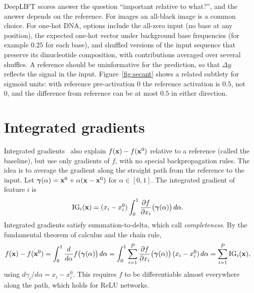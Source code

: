 DeepLIFT scores answer the question ``important relative to what?'', and the answer depends on the reference. For images an all-black image is a common choice. For one-hot DNA, options include the all-zero input (no base at any position), the expected one-hot vector under background base frequencies (for example $0.25$ for each base), and shuffled versions of the input sequence that preserve its dinucleotide composition, with contributions averaged over several shuffles. A reference should be uninformative for the prediction, so that $\Delta y$ reflects the signal in the input. Figure~\ref{fig:secant} shows a related subtlety for sigmoid units: with reference pre-activation 0 the reference activation is $0.5$, not 0, and the difference from reference can be at most $0.5$ in either direction.

\section{Integrated gradients}
\label{sec:ig}

Integrated gradients~\citep{sundararajan2017} also explain $f(\mathbf{x})-f(\mathbf{x}^0)$ relative to a reference (called the baseline), but use only gradients of $f$, with no special backpropagation rules. The idea is to average the gradient along the straight path from the reference to the input. Let $\boldsymbol{\gamma}(\alpha)=\mathbf{x}^0+\alpha(\mathbf{x}-\mathbf{x}^0)$ for $\alpha\in[0,1]$. The integrated gradient of feature $i$ is
\begin{equation}
  \operatorname{IG}_i(\mathbf{x}) = (x_i-x_i^0)\int_0^1 \frac{\partial f}{\partial x_i}\big(\boldsymbol{\gamma}(\alpha)\big)\,d\alpha .
  \label{eq:ig}
\end{equation}
Integrated gradients satisfy summation-to-delta, which \citet{sundararajan2017} call \emph{completeness}. By the fundamental theorem of calculus and the chain rule,
\begin{equation}
  f(\mathbf{x})-f(\mathbf{x}^0) = \int_0^1 \frac{d}{d\alpha}f\big(\boldsymbol{\gamma}(\alpha)\big)\,d\alpha
  = \int_0^1 \sum_{i=1}^P \frac{\partial f}{\partial x_i}\big(\boldsymbol{\gamma}(\alpha)\big)\,(x_i-x_i^0)\,d\alpha
  = \sum_{i=1}^P \operatorname{IG}_i(\mathbf{x}),
\end{equation}
using $d\gamma_i/d\alpha=x_i-x_i^0$. This requires $f$ to be differentiable almost everywhere along the path, which holds for ReLU networks.

